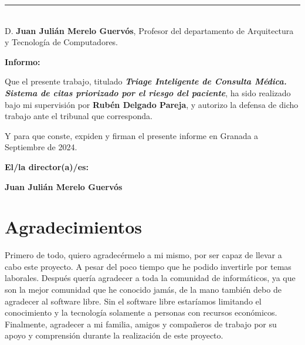 \cleardoublepage

\thispagestyle{empty}

\noindent\rule[-1ex]{\textwidth}{2pt}\\[4.5ex]

D. \textbf{Juan Julián Merelo Guervós}, Profesor del departamento de Arquitectura y Tecnología de Computadores.

\vspace{0.5cm}

\textbf{Informo:}

\vspace{0.5cm}

Que el presente trabajo, titulado \textit{\textbf{Triage Inteligente de Consulta Médica. Sistema de citas priorizado por el riesgo del paciente}},
ha sido realizado bajo mi supervisión por \textbf{Rubén Delgado Pareja}, y autorizo la defensa de dicho trabajo ante el tribunal
que corresponda.

\vspace{0.5cm}

Y para que conste, expiden y firman el presente informe en Granada a Septiembre de 2024.

\vspace{1cm}

\textbf{El/la director(a)/es: }

\vspace{5cm}

\noindent \textbf{Juan Julián Merelo Guervós}

\chapter*{Agradecimientos}

Primero de todo, quiero agradecérmelo a mi mismo, por ser capaz de llevar a cabo este proyecto. A pesar del poco tiempo que he podido invertirle por temas laborales.
Después quería agradecer a toda la comunidad de informáticos, ya que son la mejor comunidad que he conocido jamás, de la mano también debo de agradecer al software libre.
Sin el software libre estaríamos limitando el conocimiento y la tecnología solamente a personas con recursos económicos.
Finalmente, agradecer a mi familia, amigos y compañeros de trabajo por su apoyo y comprensión durante la realización de este proyecto.
